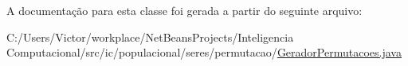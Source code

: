 A documentação para esta classe foi gerada a partir do seguinte arquivo\-:\begin{DoxyCompactItemize}
\item 
C\-:/\-Users/\-Victor/workplace/\-Net\-Beans\-Projects/\-Inteligencia Computacional/src/ic/populacional/seres/permutacao/\hyperlink{_gerador_permutacoes_8java}{Gerador\-Permutacoes.\-java}\end{DoxyCompactItemize}

